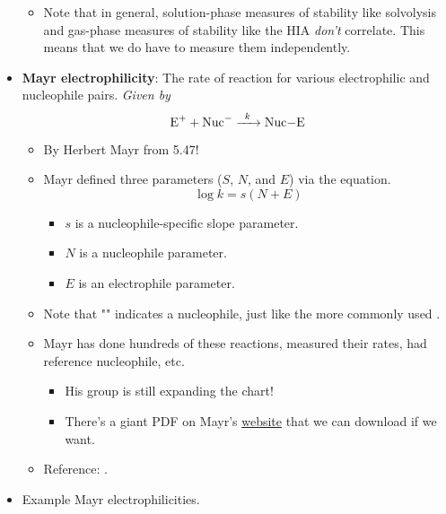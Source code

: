 \documentclass[../notes.tex]{subfiles}
\begin{document}
\begin{itemize}
\begin{itemize}
        \item Note that in general, solution-phase measures of stability like solvolysis and gas-phase measures of stability like the HIA \emph{don't} correlate. This means that we do have to measure them independently.
    \end{itemize}
    \item \textbf{Mayr electrophilicity}: The rate of reaction for various electrophilic and nucleophile pairs. \emph{Given by}
    \begin{equation*}
        \ce{E+ + Nuc- ->[$k$] Nuc-E}
    \end{equation*}
    \begin{itemize}
        \item By Herbert Mayr from 5.47!
        \item Mayr defined three parameters ($S$, $N$, and $E$) via the equation.
        \begin{equation*}
            \log k = s(N+E)
        \end{equation*}
        \begin{itemize}
            \item $s$ is a nucleophile-specific slope parameter.
            \item $N$ is a nucleophile parameter.
            \item $E$ is an electrophile parameter.
        \end{itemize}
        \item Note that "" indicates a nucleophile, just like the more commonly used .
        \item Mayr has done hundreds of these reactions, measured their rates, had reference nucleophile, etc.
        \begin{itemize}
            \item His group is still expanding the chart!
            \item There's a giant PDF on Mayr's \href{https://www.cup.uni-muenchen.de/oc/mayr/DBintro.html}{website} that we can download if we want.
        \end{itemize}
        \item Reference: \textcite{bib:Mayr}.
    \end{itemize}
    \pagebreak
    \item Example Mayr electrophilicities.
    \begin{figure}[h!]
        \centering
        \footnotesize

\end{figure}
\end{itemize}
\end{document}
